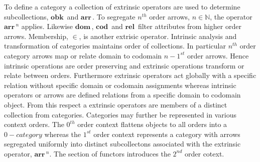 \documentclass[aps,twocolumn,secnumarabic,nobalancelastpage,amsmath,amssymb,
amsthm,nofootinbib,parskip=full]{revtex4}
\numberwithin{equation}{section}
\newcommand{\oper}[1]{\mathbf{#1}\,}
\begin{document}
To define a category a collection of extrinsic operators
are used to determine subcollections, $\oper{obk}$ and $\oper{arr}$.
To segregate $n^{th}$ order arrows, $n\in\mathbb{N}$,
the operator $\oper{arr}^n$ applies. Likewise $\oper{dom}$, $\oper{cod}$
and $\oper{rel}$ filter attributes from higher order arrows.
Membership, $\in$, is another extrisic operator.
Intrinsic analysis and transformation of categories maintains order
of collections. In particular $n^{th}$ order category arrows map or relate
domain to codomain $n-1^{st}$ order arrows. Hence intrinsic operations
are order preserving and extrinsic operations transform or relate
between orders. Furthermore extrinsic operators act globally with a
specific relation without specific
domain or codomain assignments whereas intrinsic
operators or arrows are defined relations from a specific domain to codomain
object. From this respect a extrinsic operators are members of
a distinct collection from categories.
Categories may further be represented in various context orders.
The $0^{th}$ order context flattens objects to all orders into a $0-category$
whereas the $1^{st}$ order context represents a category with
arrows segregated uniformly into distinct subcollectons associated
with the extrinsic operator, $\oper{arr}^n$.
The section of functors introduces the $2^{nd}$ order cotext.
\end{document}

